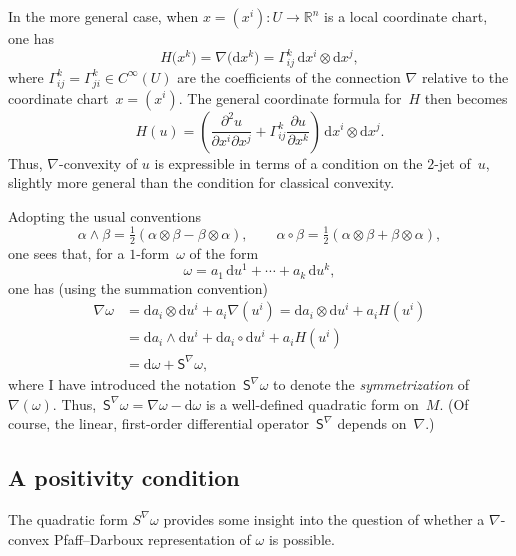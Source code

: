 \documentclass[11pt]{article}
\numberwithin{equation}{section}
\renewcommand{\d}{\mathrm{d}}%
\newcommand{\bbR}{{\mathbb R}}
\newcommand{\Ss}{\mathsf{S}}
\newcommand{\w}{\wedge}
\numberwithin{equation}{section}
\begin{document}
In the more general case, when $x = (x^i)\colon U\to \bbR^n$ is a local
coordinate chart, one has
\begin{equation*}
H\big(x^k\big) = \nabla\big(\d x^k\big) = \Gamma^k_{ij}\,\d x^i\otimes\d x^j,
\end{equation*}
where $\Gamma^k_{ij}=\Gamma^k_{ji}\in C^\infty(U)$
are the coefficients of the connection $\nabla$ relative
to the coordinate chart~$x=(x^i)$.
The general coordinate formula for~$H$ then becomes
\begin{equation*}
H(u) = \left(\frac{\partial^2 u}{\partial x^i\partial x^j}
+ \Gamma^k_{ij} \frac{\partial u}{\partial x^k}\right)
\,\d x^i\otimes\d x^j.
\end{equation*}
Thus, $\nabla$-convexity of $u$ is expressible in terms of a condition
on the $2$-jet of~$u$, slightly more general than the condition for
classical convexity.

Adopting the usual conventions
\begin{equation*}%
\alpha\w\beta
= \tfrac12(\alpha\otimes\beta-\beta\otimes\alpha), \qquad
\alpha\circ\beta
= \tfrac12(\alpha\otimes\beta+\beta\otimes\alpha),
\end{equation*}
one sees that, for a $1$-form~$\omega$ of the form
\begin{equation}\label{eq: P-Drepresentation}
\omega = a_1\,\d u^1 + \cdots + a_k\,\d u^k,
\end{equation}
one has (using the summation convention)
\begin{align*}
\nabla\omega
&= \d a_i\otimes\d u^i + a_i \nabla(u^i) = \d a_i\otimes\d u^i + a_i H(u^i)\\
&= \d a_i\w\d u^i + \d a_i\circ\d u^i + a_i H(u^i)\\
&= \d\omega + \Ss^\nabla\omega,
\end{align*}
where I have introduced
the notation~$\Ss^\nabla\omega$ to denote the {\it symmetrization\/}
of~$\nabla(\omega)$. Thus,~$\Ss^\nabla\omega
= \nabla\omega- \d\omega$
is a well-defined quadratic form on~$M$.
(Of course, the linear, first-order differential operator~$\Ss^\nabla$
depends on~$\nabla$.)


\subsection{A positivity condition}\label{ssec: poscond}
The quadratic form $S^\nabla\omega$ provides some insight
into the question of whether a $\nabla$-convex Pfaff--Darboux
representation of $\omega$ is possible.
\end{document}
